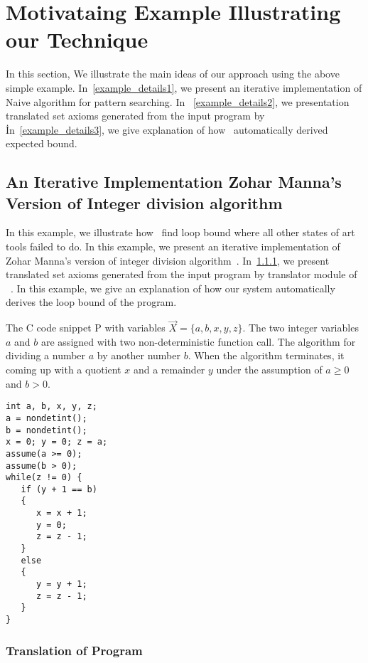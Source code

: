 \section{Motivataing Example Illustrating our Technique}
\label{sec:overview}
In this section, We illustrate the main ideas of our approach using the above simple example. In~\ref{example_details1},
we present an iterative implementation of Naive algorithm for pattern searching. In ~\ref{example_details2}, we presentation translated set axioms generated from the input program by \SystemName\. In~\ref{example_details3}, we give explanation of how \SystemName\ automatically derived expected bound. 










\subsection{An Iterative Implementation Zohar Manna's Version of Integer division algorithm}\label{example1_1}

In this example, we illustrate how \SystemName\ find loop bound where all other states of art tools failed to do. In this example, we present an iterative implementation of Zohar Manna's version of integer division algorithm~\cite{Manna:1974:IMT:542899}.
In~\ref{example1_2}, we present translated set axioms generated from
the input program by translator module of \SystemName\ . In this example, we give an explanation of how our system automatically derives the loop bound of the program.


The C code snippet P with variables $\vec{X}=\{a,b,x,y,z\}$. The two integer variables $a$ and $b$ are assigned with two non-deterministic function call. The algorithm for dividing a number $a$ by another number $b$. When the algorithm terminates, it coming up with a quotient $x$ and a remainder $y$ under the assumption of $a\geq 0$ and $b>0$.


\begin{verbatim}
int a, b, x, y, z;
a = nondetint(); 
b = nondetint();
x = 0; y = 0; z = a;
assume(a >= 0);  
assume(b > 0);
while(z != 0) {
   if (y + 1 == b)  
   { 
      x = x + 1;  
      y = 0;  
      z = z - 1; 
   }
   else 
   { 
      y = y + 1; 
      z = z - 1; 
   }
}
\end{verbatim}

\subsubsection{Translation of Program}\label{example1_2}

